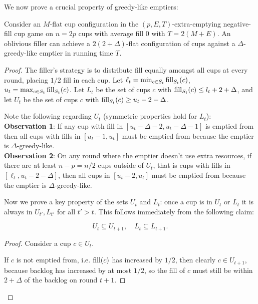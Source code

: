 We now prove a crucial property of greedy-like emptiers: 
\begin{proposition}
  \label{prop:greedylikeisflat}
  Consider an $M$-flat cup configuration in the $(p, E,
  T)$-extra-emptying negative-fill cup game on $n = 2p$ cups
  with average fill $0$ with $T = 2(M + E)$. An oblivious filler
  can achieve a $2(2+\Delta)$-flat configuration of cups against
  a $\Delta$-greedy-like emptier in running time $T$.
\end{proposition}
\begin{proof}
  The filler's strategy is to distribute fill equally amongst all
  cups at every round, placing $1/2$ fill in each cup.
  Let $\ell_t = \min_{c\in S_t} \operatorname{\textnormal{fill}}_{S_t}(c)$, $u_t = \max_{c\in S_t} \operatorname{\textnormal{fill}}_{S_t}(c)$. 
  Let $L_t$ be the set of cups $c$ with $\operatorname{\textnormal{fill}}_{S_t}(c) \le l_t+2+\Delta$, and let
  $U_t$ be the set of cups $c$ with $\operatorname{\textnormal{fill}}_{S_t}(c) \ge u_t-2-\Delta$.
  
  Note the following regarding $U_t$ (symmetric properties hold for $L_t$):\\
  \textbf{Observation 1}: If any cup with fill in $[u_t-\Delta-2,
  u_t-\Delta-1]$ is emptied from then all cups with fills in
  $[u_t-1, u_t]$ must be emptied from because the emptier is
  $\Delta$-greedy-like. \\
  \textbf{Observation 2}:
  On any round where the emptier doesn't use extra resources, if
  there are at least $n-p = n/2$ cups outside of $U_t$, that is cups
  with fills in $[\ell_t, u_t-2-\Delta]$, then all cups in
  $[u_t-2, u_t]$ must be emptied from because the emptier is
  $\Delta$-greedy-like.

  Now we prove a key property of the sets $U_t$ and $L_t$: once a cup is in
  $U_t$ or $L_t$ it is always in $U_{t'}, L_{t'}$ for all $t' > t$. This
  follows immediately from the following claim:
  \begin{clm}
    \label{clm:dontlosestuff}
    $$U_{t} \subseteq U_{t+1},\quad L_t \subseteq L_{t+1}.$$
  \end{clm}
  \begin{proof}
    Consider a cup $c\in U_t$.

    If $c$ is not emptied from, i.e. $\operatorname{\textnormal{fill}}(c)$ has increased by $1/2$, then
    clearly $c \in U_{t+1}$, because backlog has increased by at most $1/2$, so
    the fill of $c$ must still be within $2+\Delta$ of the backlog on round $t+1$. 


\end{proof}
\end{proof}
